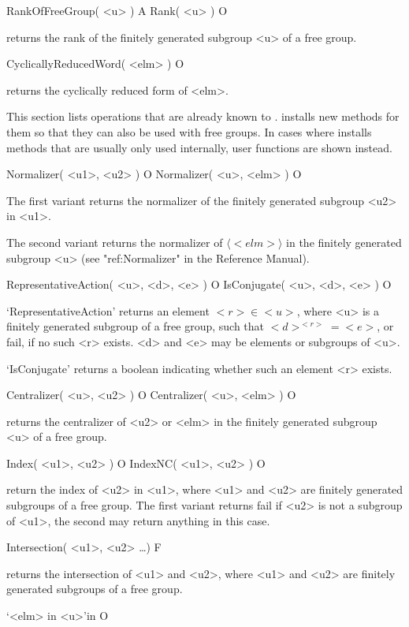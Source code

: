 \>RankOfFreeGroup( <u> ) A
\>Rank( <u> ) O

returns the rank of the finitely generated subgroup <u> of a free
group.

\>CyclicallyReducedWord( <elm> ) O

returns the cyclically reduced form of <elm>.


This section lists operations that are already known to {\GAP}.
{\FGA} installs new methods for them so that they can also be used
with free groups.
In cases where {\FGA} installs methods that are usually only used
internally, user functions are shown instead.


\>Normalizer( <u1>, <u2> ) O
\>Normalizer( <u>, <elm> ) O

The first variant returns the normalizer of the finitely generated
subgroup <u2> in <u1>.

The second variant returns the normalizer of $\langle <elm> \rangle$
in the finitely generated subgroup <u> (see "ref:Normalizer" in the
Reference Manual).

\>RepresentativeAction( <u>, <d>, <e> ) O
\>IsConjugate( <u>, <d>, <e> ) O

`RepresentativeAction' returns an element $ <r> \in <u> $,
where <u> is a finitely generated subgroup of a free group, such
that $<d>^{<r>}=<e>$, or fail, if no such <r> exists.  <d> and <e> may
be elements or subgroups of <u>.

`IsConjugate' returns a boolean indicating whether such an element <r>
exists.

\>Centralizer( <u>, <u2> ) O
\>Centralizer( <u>, <elm> ) O

returns the centralizer of <u2> or <elm> in the finitely generated
subgroup <u> of a free group.

\>Index( <u1>, <u2> ) O
\>IndexNC( <u1>, <u2> ) O

return the index of <u2> in <u1>, where <u1> and <u2> are finitely
generated subgroups of a free group.  The first variant returns
fail if <u2> is not a subgroup of <u1>, the second may return
anything in this case.

\>Intersection( <u1>, <u2> \dots ) F

returns the intersection of <u1> and <u2>, where <u1> and <u2> are
finitely generated subgroups of a free group.

\>`<elm> in <u>'{in} O

